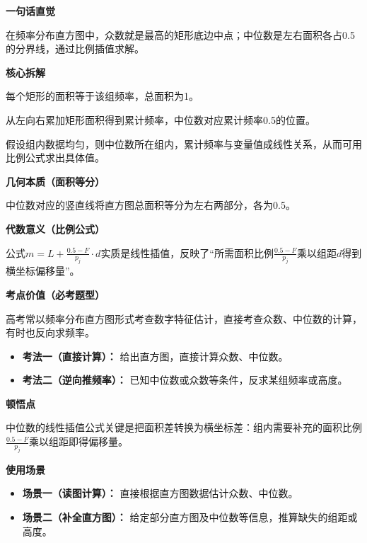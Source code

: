 \begin{explanationbox}
	\textbf{\textcolor{CExplanation}{一句话直觉}}

	在频率分布直方图中，众数就是最高的矩形底边中点；中位数是左右面积各占0.5的分界线，通过比例插值求解。

	\medskip
	\textbf{\textcolor{CExplanation}{核心拆解}}
	\begin{description}[style=nextline, leftmargin=2.8em, labelsep=0.5em, itemsep=0.45em]
		\item[\textbf{要点一（面积即频率）：}] 每个矩形的面积等于该组频率，总面积为1。
		\item[\textbf{要点二（累计频率）：}] 从左向右累加矩形面积得到累计频率，中位数对应累计频率0.5的位置。
		\item[\textbf{要点三（线性插值）：}] 假设组内数据均匀，则中位数所在组内，累计频率与变量值成线性关系，从而可用比例公式求出具体值。
	\end{description}

	\medskip
	\textbf{\textcolor{CExplanation}{几何本质（面积等分）}}

	中位数对应的竖直线将直方图总面积等分为左右两部分，各为0.5。

	\medskip
	\textbf{\textcolor{CExplanation}{代数意义（比例公式）}}

	公式$m = L + \frac{0.5 - F}{p_j} \cdot d$实质是线性插值，反映了“所需面积比例$\frac{0.5-F}{p_j}$乘以组距$d$得到横坐标偏移量”。

	\medskip
	\textbf{\textcolor{CExplanation}{考点价值（必考题型）}}

	高考常以频率分布直方图形式考查数字特征估计，直接考查众数、中位数的计算，有时也反向求频率。
	\begin{itemize}[leftmargin=*, itemsep=0.5em, topsep=0.4em]
		\item \textbf{考法一（直接计算）：} 给出直方图，直接计算众数、中位数。
		\item \textbf{考法二（逆向推频率）：} 已知中位数或众数等条件，反求某组频率或高度。
	\end{itemize}

	\medskip
	\textbf{\textcolor{CExplanation}{顿悟点}}

	中位数的线性插值公式关键是把面积差转换为横坐标差：组内需要补充的面积比例$\frac{0.5-F}{p_j}$乘以组距即得偏移量。

	\medskip
	\textbf{\textcolor{CExplanation}{使用场景}}
	\begin{itemize}[leftmargin=*, itemsep=0.5em, topsep=0.4em]
		\item \textbf{场景一（读图计算）：} 直接根据直方图数据估计众数、中位数。
		\item \textbf{场景二（补全直方图）：} 给定部分直方图及中位数等信息，推算缺失的组距或高度。
	\end{itemize}
\end{explanationbox}
